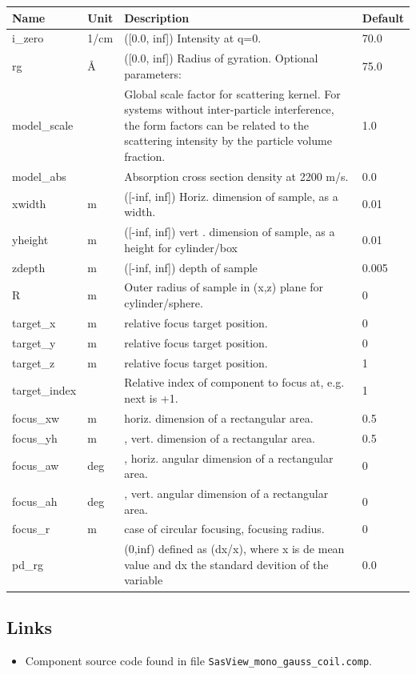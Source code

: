 \begin{longtable}{p{}p{}p{}p{}}
\toprule
\textbf{Name} & \textbf{Unit} & \textbf{Description} & \textbf{Default} \\
\midrule
\endhead
i\_zero & 1/cm & ([0.0, inf]) Intensity at q=0. & 70.0 \\
rg & \AA{} & ([0.0, inf]) Radius of gyration. Optional parameters: & 75.0 \\
model\_scale &   & Global scale factor for scattering kernel. For systems without inter-particle interference, the form factors can be related to the scattering intensity by the particle volume fraction. & 1.0 \\
model\_abs &   & Absorption cross section density at 2200 m/s. & 0.0 \\
xwidth & m & ([-inf, inf]) Horiz. dimension of sample, as a width. & 0.01 \\
yheight & m & ([-inf, inf]) vert . dimension of sample, as a height for cylinder/box & 0.01 \\
zdepth & m & ([-inf, inf]) depth of sample & 0.005 \\
R & m & Outer radius of sample in (x,z) plane for cylinder/sphere. & 0 \\
target\_x & m & relative focus target position. & 0 \\
target\_y & m & relative focus target position. & 0 \\
target\_z & m & relative focus target position. & 1 \\
target\_index &   & Relative index of component to focus at, e.g. next is +1. & 1 \\
focus\_xw & m & horiz. dimension of a rectangular area. & 0.5 \\
focus\_yh & m & , vert. dimension of a rectangular area. & 0.5 \\
focus\_aw & deg & , horiz. angular dimension of a rectangular area. & 0 \\
focus\_ah & deg & , vert. angular dimension of a rectangular area. & 0 \\
focus\_r & m & case of circular focusing, focusing radius. & 0 \\
pd\_rg &  & (0,inf) defined as (dx/x), where x is de mean value and dx the standard devition of the variable & 0.0 \\
\bottomrule
\end{longtable}

\subsection*{Links}
\begin{itemize}
  \item Component source code found in file \texttt{SasView\_mono\_gauss\_coil.comp}.
\end{itemize}
